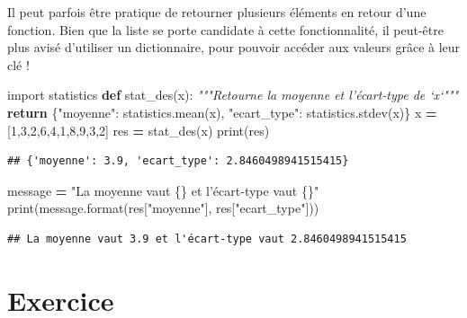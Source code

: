 \documentclass[12pt,]{book}
\newenvironment{Shaded}{\begin{snugshade}}{\end{snugshade}}
\newcommand{\KeywordTok}[1]{\textcolor[rgb]{0.13,0.29,0.53}{\textbf{#1}}}
\newcommand{\DecValTok}[1]{\textcolor[rgb]{0.00,0.00,0.81}{#1}}
\newcommand{\SpecialCharTok}[1]{\textcolor[rgb]{0.00,0.00,0.00}{#1}}
\newcommand{\StringTok}[1]{\textcolor[rgb]{0.31,0.60,0.02}{#1}}
\newcommand{\ImportTok}[1]{#1}
\newcommand{\CommentTok}[1]{\textcolor[rgb]{0.56,0.35,0.01}{\textit{#1}}}
\newcommand{\ControlFlowTok}[1]{\textcolor[rgb]{0.13,0.29,0.53}{\textbf{#1}}}
\newcommand{\OperatorTok}[1]{\textcolor[rgb]{0.81,0.36,0.00}{\textbf{#1}}}
\newcommand{\BuiltInTok}[1]{#1}
\newcommand{\NormalTok}[1]{#1}
\numberwithin{equation}{section}
\numberwithin{countremarque}{section}
\begin{document}
Il peut parfois être pratique de retourner plusieurs éléments en retour
d'une fonction. Bien que la liste se porte candidate à cette
fonctionnalité, il peut-être plus avisé d'utiliser un dictionnaire, pour
pouvoir accéder aux valeurs grâce à leur clé !

\begin{Shaded}
\begin{Highlighting}[]
\ImportTok{import}\NormalTok{ statistics}
\KeywordTok{def}\NormalTok{ stat_des(x):}
  \CommentTok{"""Retourne la moyenne et l'écart-type de `x`"""}
  \ControlFlowTok{return}\NormalTok{ \{}\StringTok{"moyenne"}\NormalTok{: statistics.mean(x),}
  \StringTok{"ecart_type"}\NormalTok{: statistics.stdev(x)\}}
\NormalTok{x }\OperatorTok{=}\NormalTok{ [}\DecValTok{1}\NormalTok{,}\DecValTok{3}\NormalTok{,}\DecValTok{2}\NormalTok{,}\DecValTok{6}\NormalTok{,}\DecValTok{4}\NormalTok{,}\DecValTok{1}\NormalTok{,}\DecValTok{8}\NormalTok{,}\DecValTok{9}\NormalTok{,}\DecValTok{3}\NormalTok{,}\DecValTok{2}\NormalTok{]}
\NormalTok{res }\OperatorTok{=}\NormalTok{ stat_des(x)}
\BuiltInTok{print}\NormalTok{(res)}
\end{Highlighting}
\end{Shaded}

\begin{lstlisting}
## {'moyenne': 3.9, 'ecart_type': 2.8460498941515415}
\end{lstlisting}

\begin{Shaded}
\begin{Highlighting}[]
\NormalTok{message }\OperatorTok{=} \StringTok{"La moyenne vaut }\SpecialCharTok{\{\}}\StringTok{ et l'écart-type vaut }\SpecialCharTok{\{\}}\StringTok{"}
\BuiltInTok{print}\NormalTok{(message.}\BuiltInTok{format}\NormalTok{(res[}\StringTok{"moyenne"}\NormalTok{], res[}\StringTok{"ecart_type"}\NormalTok{]))}
\end{Highlighting}
\end{Shaded}

\begin{lstlisting}
## La moyenne vaut 3.9 et l'écart-type vaut 2.8460498941515415
\end{lstlisting}

\section{Exercice}\label{exercice-6}
\end{document}
